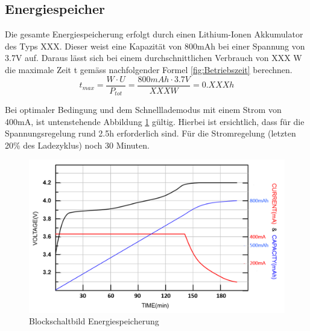 \subsection{Energiespeicher}

Die gesamte Energiespeicherung erfolgt durch einen Lithium-Ionen Akkumulator des Typs XXX. Dieser weist eine Kapazität von 800mAh bei einer Spannung von 3.7V auf. Daraus lässt sich bei einem durchschnittlichen Verbrauch von XXX W die maximale Zeit t gemäss nachfolgender Formel \ref{fig:Betriebszeit} berechnen.
\begin{equation}
t_{max}=\frac{W\cdot U}{P_{tot}}=\frac{800mAh \cdot 3.7V}{XXX W}=0.XXX h
\label{fig:Betriebszeit}
\end{equation}


Bei optimaler Bedingung und dem Schnelllademodus mit einem Strom von 400mA, ist untenstehende Abbildung  \ref{fig:Ladekurve Li-Ion Akku}  gültig. Hierbei ist ersichtlich, dass für die Spannungsregelung rund 2.5h erforderlich sind. Für die Stromregelung (letzten 20\% des Ladezyklus) noch 30 Minuten.



\begin{figure}[H]
	\begin{center}
		\includegraphics[width=120mm]{data/LadekurveLiIon.png}
		\caption{Blockschaltbild Energiespeicherung} %
		\label{fig:Ladekurve Li-Ion Akku}
	\end{center}
\end{figure}



